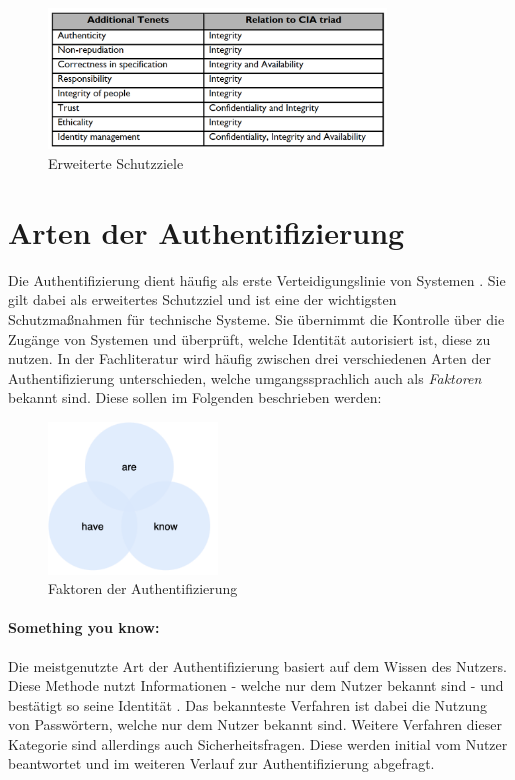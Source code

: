 \begin{figure}[h]
	\centering 
	\includegraphics[width=0.8\textwidth]{img/abbildungen/Schutzziele.png}
	\captionsetup{format=hang}
	\caption{Erweiterte Schutzziele \cite{samonas2014cia}} \label{Schutzziele}
\end{figure}



\section{Arten der Authentifizierung}

Die Authentifizierung dient häufig als erste Verteidigungslinie von Systemen \cite{boonkrong2012security}. Sie gilt dabei als erweitertes Schutzziel und ist eine der wichtigsten Schutzmaßnahmen für technische Systeme. Sie übernimmt die Kontrolle über die Zugänge von Systemen und überprüft, welche Identität autorisiert ist, diese zu nutzen. In der Fachliteratur wird häufig zwischen drei verschiedenen Arten der Authentifizierung unterschieden, welche umgangssprachlich auch als \textit{Faktoren} bekannt sind. Diese sollen im Folgenden beschrieben werden:

\begin{figure}[h]
	\centering 
	\includegraphics[width=0.4\textwidth]{img/abbildungen/factors.png}
	\captionsetup{format=hang}
	\caption{Faktoren der Authentifizierung}
\end{figure}

\paragraph*{Something you know:}
Die meistgenutzte Art der Authentifizierung basiert auf dem Wissen des Nutzers. Diese Methode nutzt Informationen - welche nur dem Nutzer bekannt sind - und bestätigt so seine Identität \cite{boonkrong2012security}. Das bekannteste Verfahren ist dabei die Nutzung von Passwörtern, welche nur dem Nutzer bekannt sind. Weitere Verfahren dieser Kategorie sind allerdings auch Sicherheitsfragen. Diese werden initial vom Nutzer beantwortet und im weiteren Verlauf zur Authentifizierung abgefragt.

